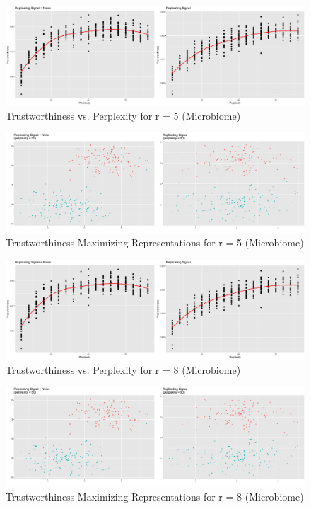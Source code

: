 \documentclass{article}
\begin{document}
\begin{figure}[H]
\centering
\includegraphics[scale=0.205]{trust_plot_enterotype}
\caption{Trustworthiness vs. Perplexity for r = 5 (Microbiome)}
\end{figure}

\begin{figure}[H]
\centering
\includegraphics[scale=0.102]{best_rep_enterotype}
\caption{Trustworthiness-Maximizing Representations for r = 5 (Microbiome)}
\end{figure}

\begin{figure}[H]
\centering
\includegraphics[scale=0.205]{trust_plot_enterotype}
\caption{Trustworthiness vs. Perplexity for r = 8 (Microbiome)}
\end{figure}

\begin{figure}[H]
\centering
\includegraphics[scale=0.102]{best_rep_enterotype}
\caption{Trustworthiness-Maximizing Representations for r = 8 (Microbiome)}
\end{figure}
\end{document}
